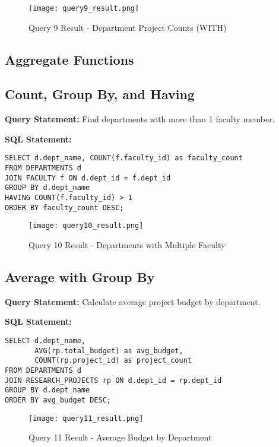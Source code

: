\documentclass[12pt,a4paper]{article}
\begin{document}
\begin{figure}[H]
    \centering
    \texttt{[image: query9\_result.png]}
    \caption{Query 9 Result - Department Project Counts (WITH)}
\end{figure}

\subsection{Aggregate Functions}

\subsection{Count, Group By, and Having}
\textbf{Query Statement:} Find departments with more than 1 faculty member.

\textbf{SQL Statement:}
\begin{lstlisting}[style=sqlstyle]
SELECT d.dept_name, COUNT(f.faculty_id) as faculty_count
FROM DEPARTMENTS d
JOIN FACULTY f ON d.dept_id = f.dept_id
GROUP BY d.dept_name
HAVING COUNT(f.faculty_id) > 1
ORDER BY faculty_count DESC;
\end{lstlisting}

\begin{figure}[H]
    \centering
    \texttt{[image: query10\_result.png]}
    \caption{Query 10 Result - Departments with Multiple Faculty}
\end{figure}

\subsection{Average with Group By}
\textbf{Query Statement:} Calculate average project budget by department.

\textbf{SQL Statement:}
\begin{lstlisting}[style=sqlstyle]
SELECT d.dept_name, 
       AVG(rp.total_budget) as avg_budget,
       COUNT(rp.project_id) as project_count
FROM DEPARTMENTS d
JOIN RESEARCH_PROJECTS rp ON d.dept_id = rp.dept_id
GROUP BY d.dept_name
ORDER BY avg_budget DESC;
\end{lstlisting}

\begin{figure}[H]
    \centering
    \texttt{[image: query11\_result.png]}
    \caption{Query 11 Result - Average Budget by Department}
\end{figure}
\end{document}
